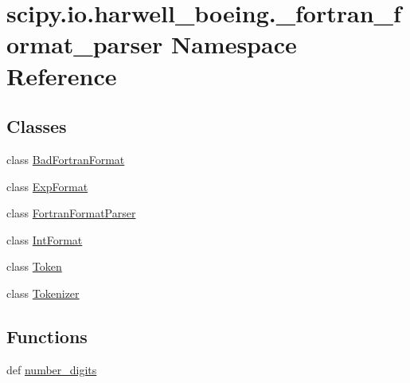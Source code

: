 \hypertarget{namespacescipy_1_1io_1_1harwell__boeing_1_1__fortran__format__parser}{}\section{scipy.\+io.\+harwell\+\_\+boeing.\+\_\+fortran\+\_\+format\+\_\+parser Namespace Reference}
\label{namespacescipy_1_1io_1_1harwell__boeing_1_1__fortran__format__parser}
\subsection*{Classes}
\begin{DoxyCompactItemize}
\item 
class \hyperlink{classscipy_1_1io_1_1harwell__boeing_1_1__fortran__format__parser_1_1BadFortranFormat}{Bad\+Fortran\+Format}
\item 
class \hyperlink{classscipy_1_1io_1_1harwell__boeing_1_1__fortran__format__parser_1_1ExpFormat}{Exp\+Format}
\item 
class \hyperlink{classscipy_1_1io_1_1harwell__boeing_1_1__fortran__format__parser_1_1FortranFormatParser}{Fortran\+Format\+Parser}
\item 
class \hyperlink{classscipy_1_1io_1_1harwell__boeing_1_1__fortran__format__parser_1_1IntFormat}{Int\+Format}
\item 
class \hyperlink{classscipy_1_1io_1_1harwell__boeing_1_1__fortran__format__parser_1_1Token}{Token}
\item 
class \hyperlink{classscipy_1_1io_1_1harwell__boeing_1_1__fortran__format__parser_1_1Tokenizer}{Tokenizer}
\end{DoxyCompactItemize}
\subsection*{Functions}
\begin{DoxyCompactItemize}
\item 
def \hyperlink{namespacescipy_1_1io_1_1harwell__boeing_1_1__fortran__format__parser_a8e6bf55a4a6293b9ed52662da6b4c363}{number\+\_\+digits}
\end{DoxyCompactItemize}
